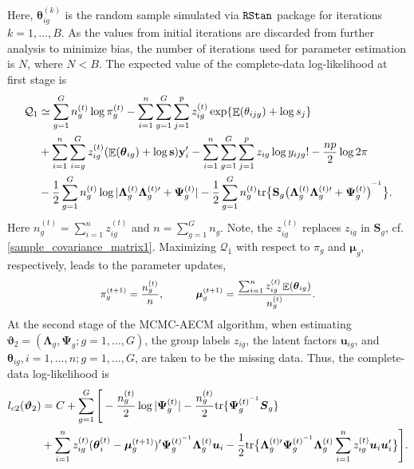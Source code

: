 \documentclass[12pt]{article}
\newcommand{\vecmu}{\mbox{\boldmath$\mu$}}
\newcommand{\inv}{^{\raisebox{.2ex}{$\scriptscriptstyle-1$}}}
\DeclareMathOperator{\E}{\mathbb{E}}
\begin{document}
Here, $ \boldsymbol{\theta}_{ig}^{(k)}$ is the random sample simulated via ${\tt RStan}$ package for iterations $k = 1,\ldots, B$. As the values from initial iterations are discarded from further analysis to minimize bias, the number of iterations used for parameter estimation is $N$, where $N < B$. The expected value of the complete-data log-likelihood at first stage is
\begin{equation*}
\begin{split}
\mathcal{Q}_1 & \simeq \sum_{g=1}^G n_g^{(t)} \log \pi_g^{(t)} - \sum_{i=1}^n \sum_{g=1}^G \sum_{j=1}^p z_{ig}^{(t)} \exp\{\E(\theta_{ijg}) + \log s_j\} \\
& + \sum_{i=1}^n \sum_{i=g}^G z_{ig}^{(t)} (\E(\boldsymbol{\theta}_{ig}) + \log \mathbf{s}) \mathbf{y}_i^{\prime} - \sum_{i=1}^n \sum_{g=1}^G \sum_{j=1}^p z_{ig} \log y_{ijg}! - \frac{np}{2} \log 2 \pi \\
& - \frac{1}{2} \sum_{g=1}^G n_g^{(t)} \log | \mathbf{\Lambda}_g^{(t)} \mathbf{\Lambda}_g^{(t) \prime} + \mathbf{\Psi}_g^{(t)}| - \frac{1}{2} \sum_{g=1}^G n_g^{(t)} \text{tr} \big\{ \mathbf{S}_g \big( \mathbf{\Lambda}_g^{(t)} \mathbf{\Lambda}_g^{(t) \prime} + \mathbf{\Psi}_g^{(t)} \big)^{\inv} \big\}.
\end{split}
\end{equation*}
Here $n_g^{(t)} = \sum_{i=1}^n z_{ig}^{(t)}$ and $n = \sum_{g=1}^G n_g$. Note, the $z_{ig}^{(t)}$ replaces $z_{ig}$ in $\boldsymbol{S}_g$, cf. \eqref{sample_covariance_matrix1}. Maximizing $\mathcal{Q}_1$ with respect to $\pi_g$ and $\boldsymbol{\mu}_g$, respectively, leads to the parameter updates,
\begin{equation*}
\small \pi_g^{(t+1)} = \frac{n_g^{(t)}}{n}, \hspace{10mm} \small \vecmu^{(t+1)}_{g} = \frac{\sum_{i=1}^n z_{ig}^{(t)} \E(\boldsymbol{\theta}_{ig})} {n_g^{(t)}}.
\end{equation*}
At the second stage of the MCMC-AECM algorithm, when estimating $\boldsymbol{\vartheta}_2 = (\boldsymbol{\Lambda}_g, \boldsymbol{\Psi}_g; g = 1, \ldots, G)$, the group labels $z_{ig}$, the latent factors $\mathbf{u}_{ig}$, and $\boldsymbol{\theta}_{ig}, i = 1, \ldots, n; g = 1,\ldots,G$, are taken to be the missing data. Thus, the complete-data log-likelihood is
\begin{equation*}
\begin{split}
l_{c2}(\boldsymbol{\vartheta}_2)  & =  C + \sum_{g=1}^G \Bigg[ -\frac{n_g^{(t)}}{2} \log | \boldsymbol{\Psi}_g^{(t)} | - \frac{n_g^{(t)}}{2}\text{tr} \{\boldsymbol{\Psi}_g^{(t)  \inv} \boldsymbol{S}_g \} \\
& + \sum_{i=1}^n z_{ig}^{(t)} (\boldsymbol{\theta}_i^{(t)} - \boldsymbol{\mu}_g^{(t+1)})^{\prime} \boldsymbol{\Psi}_g^{(t) \inv} \boldsymbol{\Lambda}_g^{(t)} \boldsymbol{u}_i - \frac{1}{2} \text{tr} \big\{ \boldsymbol{\Lambda}_g^{(t) \prime} \boldsymbol{\Psi}_g^{(t)  \inv} \boldsymbol{\Lambda}_g^{(t)} \sum_{i=1}^n z_{ig}^{(t)} \boldsymbol{u}_i  \boldsymbol{u}_i^{\prime} \big\} \Bigg].
\end{split}
\end{equation*}
\end{document}
